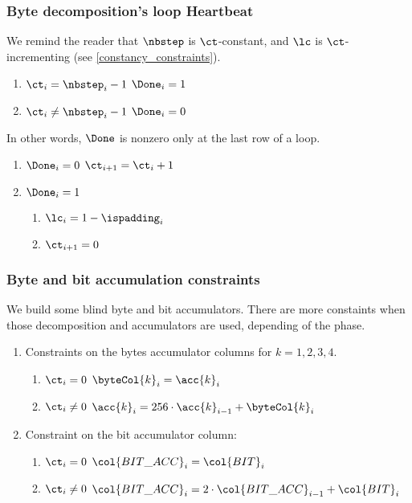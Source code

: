 \subsubsection{Byte decomposition's loop Heartbeat}
\begin{center}
\end{center}
We remind the reader that $\nbstep$ is $\ct$-constant, and $\lc$ is $\ct$-incrementing (see \ref{constancy_constraints}).
\begin{enumerate}
    \item \If $\ct_{i}=\nbstep_{i}-1$ \Then $\Done_{i}=1$
    \item \If $\ct_{i} \neq \nbstep_{i}-1$ \Then $\Done_{i}=0$
\end{enumerate}
In other words, $\Done$ is nonzero only at the last row of a loop.
\begin{enumerate}[resume]
    \item \If $\Done_{i}=0$ \Then $\ct_{i+1} = \ct_{i} +1$
    \item \If $\Done_{i}=1$ \Then
    \begin{enumerate}
        \item $\lc_{i}=1-\ispadding_{i}$
        \item $\ct_{i+1} = 0$
    \end{enumerate}
\end{enumerate}

\subsubsection{Byte and bit accumulation constraints}
We build some blind byte and bit accumulators. There are more constaints when those decomposition and accumulators are used, depending of the phase.
\begin{enumerate}
    \item Constraints on the bytes accumulator columns for $k= 1,2, 3, 4$.
    \begin{enumerate}
        \item \If $\ct_{i}=0$ \Then $\byteCol{k}_{i} = \acc{k}_{i}$
        \item \If $\ct_{i} \neq 0$  \Then $\acc{k}_{i}=256 \cdot \acc{k}_{i-1} + \byteCol{k}_{i}$
    \end{enumerate}
    \item Constraint on the bit accumulator column:
    \begin{enumerate}
        \item \If $\ct_{i}=0$ \Then $\col{BIT\_ACC}_{i} = \col{BIT}_{i}$
        \item \If $\ct_{i} \neq 0$  \Then $\col{BIT\_ACC}_{i}=2 \cdot \col{BIT\_ACC}_{i-1} + \col{BIT}_{i}$
    \end{enumerate}
\end{enumerate}

